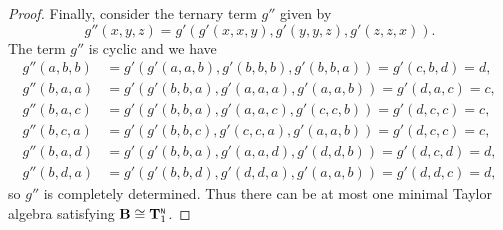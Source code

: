 \documentclass[11pt]{amsart}
\newcommand{\m}[1]{\mathbf{\uppercase{#1}}}
\newcommand{\n}{\scriptscriptstyle{\mathsf{N}}}
\theoremstyle{definition}
\theoremstyle{remark}
\theoremstyle{plain}
\def\T{\mathbf{T}}
\begin{document}
\begin{proof}
Finally, consider the ternary term $g''$ given by $$g''(x,y,z)=g'(g'(x,x,y),g'(y,y,z),g'(z,z,x)).$$ The term $g''$ is cyclic and we have
\begin{align*}
g''(a,b,b)&=g'(g'(a,a,b),g'(b,b,b),g'(b,b,a))=g'(c,b,d)=d,\\
g''(b,a,a)&=g'(g'(b,b,a),g'(a,a,a),g'(a,a,b))=g'(d,a,c)=c,\\
g''(b,a,c)&=g'(g'(b,b,a), g'(a,a,c), g'(c,c,b))=g'(d,c,c)=c,\\
g''(b,c,a)&=g'(g'(b,b,c), g'(c,c,a), g'(a,a,b))=g'(d,c,c)=c,\\
g''(b,a,d)&=g'(g'(b,b,a), g'(a,a,d), g'(d,d,b))=g'(d,c,d)=d,\\
g''(b,d,a)&=g'(g'(b,b,d), g'(d,d,a), g'(a,a,b))=g'(d,d,c)=d,
\end{align*}
so $g''$ is completely determined. Thus there can be at most one minimal Taylor algebra satisfying $\m b\cong {\T}_1^{\n}$.


\end{proof}
\end{document}
